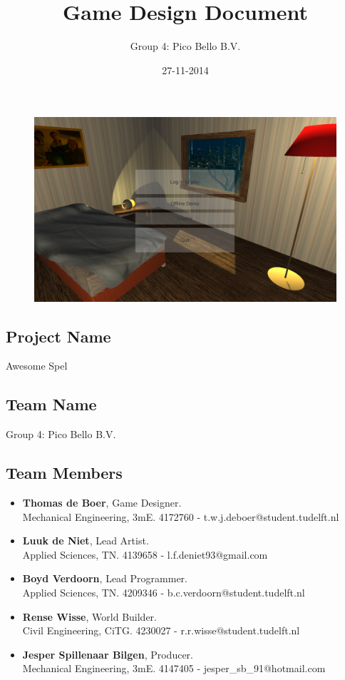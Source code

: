 \documentclass{article}
\title{Game Design Document}
\author{Group 4: Pico Bello B.V.}
\date{27-11-2014}
\begin{document}
	\selectfont



	\maketitle
	\begin{figure}[ht!]
		\centering
		\includegraphics[width=120mm]{images/Front.png}
	\end{figure}
	\newpage
\subsection*{Project Name}
	\qquad Awesome Spel
\subsection*{Team Name}
	\qquad Group 4: Pico Bello B.V.
\subsection*{Team Members}
	\begin{itemize}
		\item\textbf{Thomas de Boer}, Game Designer.\\Mechanical Engineering, 3mE. 4172760 - t.w.j.deboer@student.tudelft.nl\\
		\item\textbf{Luuk de Niet}, Lead Artist.\\Applied Sciences, TN. 4139658 - l.f.deniet93@gmail.com\\
		\item\textbf{Boyd Verdoorn}, Lead Programmer.\\Applied Sciences, TN. 4209346 - b.c.verdoorn@student.tudelft.nl\\
		\item\textbf{Rense Wisse}, World Builder.\\Civil Engineering, CiTG. 4230027 - r.r.wisse@student.tudelft.nl\\
		\item\textbf{Jesper Spillenaar Bilgen}, Producer.\\Mechanical Engineering, 3mE. 4147405 - jesper\_sb\_91@hotmail.com
	\end{itemize}
\end{document}
